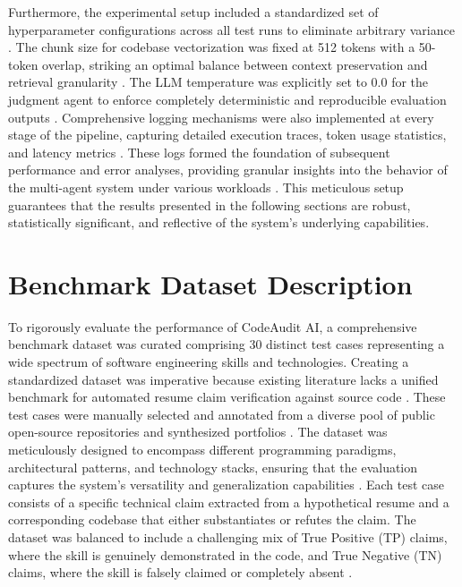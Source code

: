 Furthermore, the experimental setup included a standardized set of hyperparameter configurations across all test runs to eliminate arbitrary variance \cite{ref33, ref9}. The chunk size for codebase vectorization was fixed at 512 tokens with a 50-token overlap, striking an optimal balance between context preservation and retrieval granularity \cite{ref61}. The LLM temperature was explicitly set to 0.0 for the judgment agent to enforce completely deterministic and reproducible evaluation outputs \cite{ref55}. Comprehensive logging mechanisms were also implemented at every stage of the pipeline, capturing detailed execution traces, token usage statistics, and latency metrics \cite{ref53}. These logs formed the foundation of subsequent performance and error analyses, providing granular insights into the behavior of the multi-agent system under various workloads \cite{ref45}. This meticulous setup guarantees that the results presented in the following sections are robust, statistically significant, and reflective of the system's underlying capabilities.

\section{Benchmark Dataset Description}

To rigorously evaluate the performance of CodeAudit AI, a comprehensive benchmark dataset was curated comprising 30 distinct test cases representing a wide spectrum of software engineering skills and technologies. Creating a standardized dataset was imperative because existing literature lacks a unified benchmark for automated resume claim verification against source code \cite{ref67, ref42}. These test cases were manually selected and annotated from a diverse pool of public open-source repositories and synthesized portfolios \cite{ref31}. The dataset was meticulously designed to encompass different programming paradigms, architectural patterns, and technology stacks, ensuring that the evaluation captures the system's versatility and generalization capabilities \cite{ref12}. Each test case consists of a specific technical claim extracted from a hypothetical resume and a corresponding codebase that either substantiates or refutes the claim. The dataset was balanced to include a challenging mix of True Positive (TP) claims, where the skill is genuinely demonstrated in the code, and True Negative (TN) claims, where the skill is falsely claimed or completely absent \cite{ref69}.


